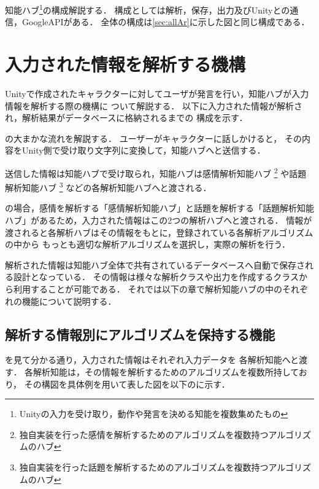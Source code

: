 知能ハブ\footnote{Unityの入力を受け取り，動作や発言を決める知能を複数集めたもの}の構成解説する．
構成としては解析，保存，出力及びUnityとの通信，GoogleAPIがある．
全体の構成は\ref{sec:allAr}に示した図と同じ構成である．

\section{入力された情報を解析する機構}
Unityで作成されたキャラクターに対してユーザが発言を行い，知能ハブが入力情報を解析する際の機構に
ついて解説する．
以下に入力された情報が解析され，解析結果がデータベースに格納されるまでの
構成を示す．


の大まかな流れを解説する．
ユーザーがキャラクターに話しかけると，
その内容をUnity側で受け取り文字列に変換して，知能ハブへと送信する．

送信した情報は知能ハブで受け取られ，知能ハブは感情解析知能ハブ
\footnote{独自実装を行った感情を解析するためのアルゴリズムを複数持つアルゴリズムのハブ}
や話題解析知能ハブ
\footnote{独自実装を行った話題を解析するためのアルゴリズムを複数持つアルゴリズムのハブ}
などの各解析知能ハブへと渡される．

の場合，感情を解析する「感情解析知能ハブ」と話題を解析する「話題解析知能
ハブ」があるため，入力された情報はこの2つの解析ハブへと渡される．
情報が渡されると各解析ハブはその情報をもとに，登録されている各解析アルゴリズムの中から
もっとも適切な解析アルゴリズムを選択し，実際の解析を行う．

解析された情報は知能ハブ全体で共有されているデータベースへ自動で保存される設計となっている．
その情報は様々な解析クラスや出力を作成するクラスから利用することが可能である．
それでは以下の章で解析知能ハブの中のそれぞれの機能について説明する．

\subsection{解析する情報別にアルゴリズムを保持する機能}
を見て分かる通り，入力された情報はそれぞれ入力データを
各解析知能へと渡す．
各解析知能は，その情報を解析するためのアルゴリズムを複数所持しており，
その構図を具体例を用いて表した図を以下のに示す．

